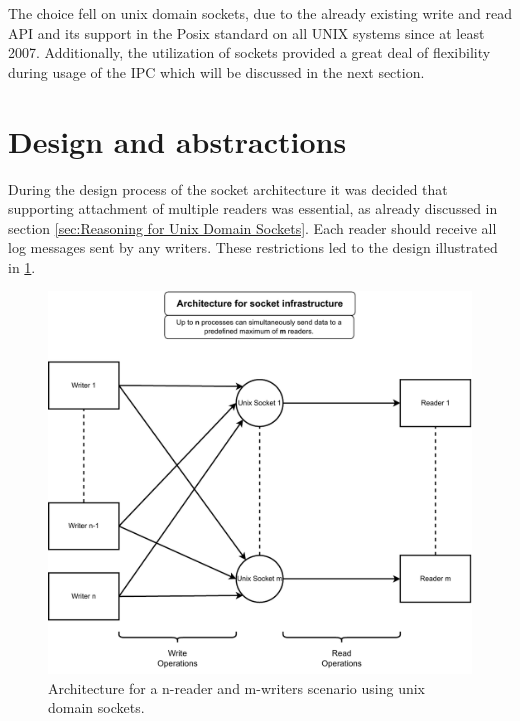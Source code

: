 The choice fell on unix domain sockets, due to the already existing write and read \ac{API} and its support in the Posix standard on all UNIX systems since at least 2007\cite{posix}.
Additionally, the utilization of sockets provided a great deal of flexibility during usage of the \ac{IPC} which will be discussed in the next section.

\section{Design and abstractions}
\label{sec:Design_and_abstractions}
During the design process of the socket architecture it was decided that supporting attachment of multiple readers was essential, as already discussed in section \ref{sec:Reasoning for Unix Domain Sockets}.
Each reader should receive all log messages sent by any writers.
These restrictions led to the design illustrated in \ref{fig:socket:architecture}.

\begin{figure}[h!]
    \centerline{\includegraphics[width=1.2\textwidth]{images/SocketArchitecture.pdf}}
    \caption[General design of socket architecture]{
        Architecture for a n-reader and m-writers scenario using unix domain sockets.}
	\label{fig:socket:architecture}
\end{figure}

